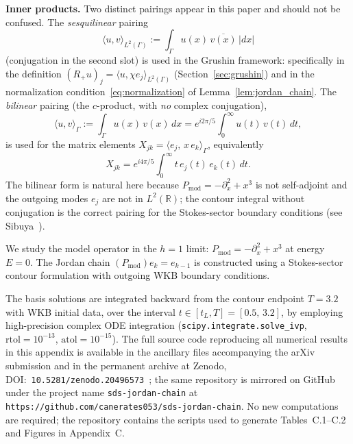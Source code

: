 \documentclass[12pt,a4paper]{amsart}
\theoremstyle{remark}
\begin{document}
\textbf{Inner products.}
Two distinct pairings appear in this paper and should not be confused.
The \emph{sesquilinear} pairing
\[
  \langle u, v \rangle_{L^2(\Gamma)}
  := \int_\Gamma u(x)\,\overline{v(x)}\,|dx|
\]
(conjugation in the second slot) is used in the Grushin framework: specifically in the definition
$(R_+u)_j = \langle u, \chi e_j\rangle_{L^2(\Gamma)}$ (Section~\ref{sec:grushin}) and in the
normalization condition~\eqref{eq:normalization} of Lemma~\ref{lem:jordan_chain}.
The \emph{bilinear} pairing (the $c$-product, with \emph{no} complex conjugation),
\[
  \langle u, v \rangle_\Gamma := \int_\Gamma u(x)\,v(x)\,dx
  = e^{i2\pi/5}\int_0^\infty u(t)\,v(t)\,dt,
\]
is used for the matrix elements $X_{jk} = \langle e_j,\, x\,e_k\rangle_\Gamma$,
equivalently
\[
  X_{jk} = e^{i4\pi/5}\int_0^\infty t\,e_j(t)\,e_k(t)\,dt.
\]
The bilinear form is natural here because $P_{\mathrm{mod}} = -\partial_x^2 + x^3$
is not self-adjoint and the outgoing modes $e_j$ are not in $L^2(\mathbb{R})$;
the contour integral without conjugation is the correct pairing
for the Stokes-sector boundary conditions (see Sibuya~\cite{Sibuya75}).

We study the model operator in the $h=1$ limit:
$P_{\mathrm{mod}} = -\partial_x^2 + x^3$ at energy $E=0$.
The Jordan chain $(P_{\mathrm{mod}})e_k = e_{k-1}$ is constructed using a
Stokes-sector contour formulation with outgoing WKB boundary conditions.

The basis solutions are integrated backward from the contour endpoint $T = 3.2$
with WKB initial data, over the interval $t \in [t_L, T] = [0.5,\, 3.2]$,
by employing high-precision complex ODE integration
(\texttt{scipy.integrate.solve\_ivp}, $\mathrm{rtol}=10^{-13}$, $\mathrm{atol}=10^{-15}$).
The full source code reproducing all numerical results in this appendix is available
in the ancillary files accompanying the arXiv submission and in the permanent archive
at Zenodo, DOI:~\texttt{10.5281/zenodo.20496573}~\cite{Ates2026code};
the same repository is mirrored on GitHub under the project name
\texttt{sds-jordan-chain} at \texttt{https://github.com/canerates053/sds-jordan-chain}.
No new computations are required; the repository contains the scripts used to
generate Tables~C.1--C.2 and Figures in Appendix~C.
\end{document}
